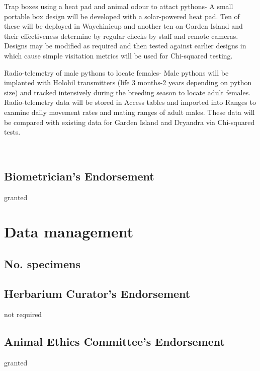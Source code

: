 \documentclass[version=last,
    paper=a4,                               %
    10pt,                                   %
    dvipsnames,
    oneside,                              %
    headings=openany,                       %
    open=any,
    BCOR=7mm,                               %
    DIV=15,     %
]{scrbook}
\begin{document}
Trap boxes using a heat pad and animal odour to attact pythons- A small
portable box design will be developed with a solar-powered heat pad. Ten
of these will be deployed in Waychinicup and another ten on Garden
Island and their effectiveness determine by regular checks by staff and
remote cameras. Designs may be modified as required and then tested
against earlier designs in which cause simple visitation metrics will be
used for Chi-squared testing.

Radio-telemetry of male pythons to locate females- Male pythons will be
implanted with Holohil transmitters (life 3 months-2 years depending on
python size) and tracked intensively during the breeding season to
locate adult females. Radio-telemetry data will be stored in Access
tables and imported into Ranges to examine daily movement rates and
mating ranges of adult males. These data will be compared with existing
data for Garden Island and Dryandra via Chi-squared tests.

~




\subsection*{Biometrician's Endorsement}

granted



\section*{Data management}


\subsection*{No. specimens}






\subsection*{Herbarium Curator's Endorsement}

not required




\subsection*{Animal Ethics Committee's Endorsement}

granted
\end{document}
